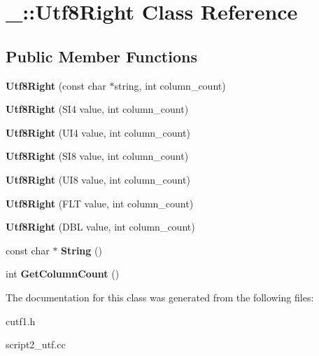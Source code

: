 \hypertarget{class___1_1_utf8_right}{}\section{\+\_\+\+:\+:Utf8\+Right Class Reference}
\label{class___1_1_utf8_right}
\subsection*{Public Member Functions}
\begin{DoxyCompactItemize}
\item 
\mbox{\label{class___1_1_utf8_right_a2a760af0a5a9eda2702ddd7f24681f8a}} 
{\bfseries Utf8\+Right} (const char $\ast$string, int column\+\_\+count)
\item 
\mbox{\label{class___1_1_utf8_right_a3effee4485e06c9d644a8a5ced09f935}} 
{\bfseries Utf8\+Right} (S\+I4 value, int column\+\_\+count)
\item 
\mbox{\label{class___1_1_utf8_right_ab5dceadaa31221751de9ffe8a7be535c}} 
{\bfseries Utf8\+Right} (U\+I4 value, int column\+\_\+count)
\item 
\mbox{\label{class___1_1_utf8_right_a7fa135eb0eca41399a597394330ac861}} 
{\bfseries Utf8\+Right} (S\+I8 value, int column\+\_\+count)
\item 
\mbox{\label{class___1_1_utf8_right_abe7a5d5bba859b840fd873db260b8a60}} 
{\bfseries Utf8\+Right} (U\+I8 value, int column\+\_\+count)
\item 
\mbox{\label{class___1_1_utf8_right_ab9bc178215a255c901eb3840681fa6a2}} 
{\bfseries Utf8\+Right} (F\+LT value, int column\+\_\+count)
\item 
\mbox{\label{class___1_1_utf8_right_a24e233b3ae3aa23c3a81baa7126686cb}} 
{\bfseries Utf8\+Right} (D\+BL value, int column\+\_\+count)
\item 
\mbox{\label{class___1_1_utf8_right_a113f3f1ba3aeba9fbf2a53156b6da82d}} 
const char $\ast$ {\bfseries String} ()
\item 
\mbox{\label{class___1_1_utf8_right_a782ebf21f4d6c629a11373215d5b9ebd}} 
int {\bfseries Get\+Column\+Count} ()
\end{DoxyCompactItemize}


The documentation for this class was generated from the following files\+:\begin{DoxyCompactItemize}
\item 
cutf1.\+h\item 
script2\+\_\+utf.\+cc\end{DoxyCompactItemize}

